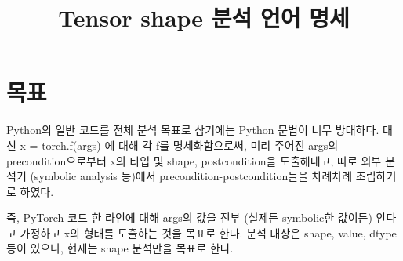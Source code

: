 \documentclass{article}
\begin{document}
\title{Tensor shape 분석 언어 명세}

\maketitle


\newcommand{\w}[1]{\ensuremath{\textit{#1}}}
\newcommand{\ttt}[1]{\texttt{#1}}
\newcommand{\x}{\times}
\newcommand{\rar}{\rightarrow}
\newcommand{\Rar}{\Rightarrow}
\newcommand{\Set}[1]{\{#1\}}
\newcommand{\Z}{\mathbb{Z}}\newcommand{\Q}{\mathbb{Q}}
\newcommand{\Maps}[3]{#1\{#2 \mapsto #3\}}
\newcommand{\U}{\cup}
\newcommand{\join}{\sqcup}


\section*{목표}
Python의 일반 코드를 전체 분석 목표로 삼기에는 Python 문법이 너무 방대하다.
대신 x = torch.f(args) 에 대해 각 f를 명세화함으로써, 미리 주어진 args의 precondition으로부터 x의 타입 및 shape, postcondition을 도출해내고, 따로 외부 분석기 (symbolic analysis 등)에서 precondition-postcondition들을 차례차례 조립하기로 하였다.

즉, PyTorch 코드 한 라인에 대해 args의 값을 전부 (실제든 symbolic한 값이든) 안다고 가정하고 x의 형태를 도출하는 것을 목표로 한다. 분석 대상은 shape, value, dtype 등이 있으나, 현재는 shape 분석만을 목표로 한다.
\end{document}
